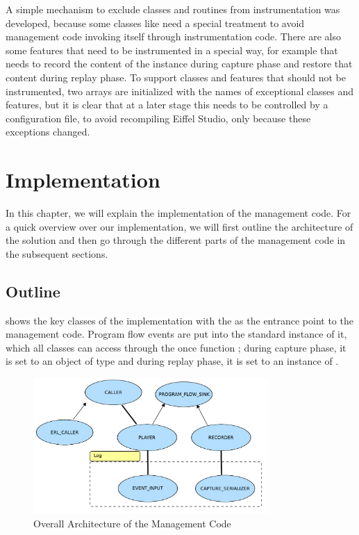 A simple mechanism to exclude classes and routines from instrumentation was developed, because some classes like  need a special treatment to avoid management code invoking itself through instrumentation code. There are also some features that need to be instrumented in a special way, for example  that needs to record the content of the instance during capture phase and restore that content during replay phase. To support classes and features that should not be instrumented, two arrays are initialized with the names of exceptional classes and features, but it is clear that at a later stage this needs to be controlled by a configuration file, to avoid recompiling Eiffel Studio, only because these exceptions changed.


\section{Implementation}
In this chapter, we will explain the implementation of the management code. For a quick overview over our implementation, we will first outline the architecture of the solution and then go through the different parts of the management code in the subsequent sections.


\subsection{Outline}
  shows the key classes of the implementation with the  as the entrance point to the management code. Program flow events are put into the standard instance of it, which all classes can access through the once function ; during capture phase, it is set to an object of type  and during replay phase, it is set to an instance of .

\begin{figure}[ht]
  \centering
  \includegraphics[width=0.8\textwidth]{illustrations/implementation_overall_architecture}
  \caption{Overall Architecture of the Management Code}
  \label{fig:implementation_overall_architecture}
\end{figure}


